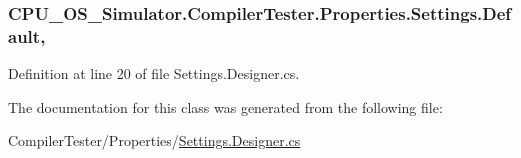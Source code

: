 \subsubsection[{Default}]{ C\+P\+U\+\_\+\+O\+S\+\_\+\+Simulator.\+Compiler\+Tester.\+Properties.\+Settings.\+Default\hspace{0.3cm}{\ttfamily [static]}, {\ttfamily [get]}}\label{class_c_p_u___o_s___simulator_1_1_compiler_tester_1_1_properties_1_1_settings_aee2389b8aff33117b4fe3a30d9440b3c}


Definition at line 20 of file Settings.\+Designer.\+cs.



The documentation for this class was generated from the following file\+:\begin{DoxyCompactItemize}
\item 
Compiler\+Tester/\+Properties/\hyperlink{_compiler_tester_2_properties_2_settings_8_designer_8cs}{Settings.\+Designer.\+cs}\end{DoxyCompactItemize}
